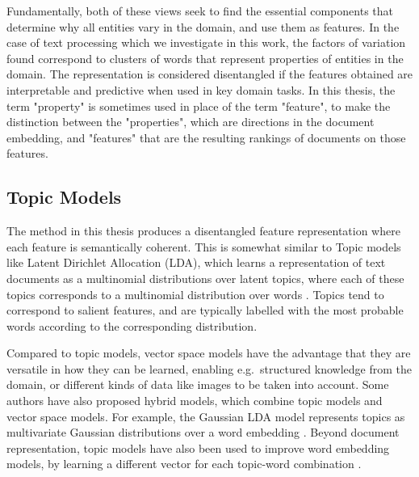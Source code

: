 Fundamentally, both of these views seek to find the essential components that determine why all entities vary in the domain, and use them as features. In the case of text processing which we investigate in this work, the factors of variation found correspond to clusters of words that represent properties of entities in the domain. The representation is considered disentangled if the features obtained are interpretable and  predictive when used in key domain tasks. In this thesis, the term "property" is sometimes used in place of the term "feature", to make the distinction between the "properties", which are directions in the document embedding, and "features"  that are the resulting rankings of documents on those features. 


\subsection{Topic Models}\label{bg:TopicModels}

The method in this thesis produces a disentangled feature representation where each feature is semantically coherent. This is somewhat similar to Topic models like Latent Dirichlet Allocation (LDA), which learns a representation of text documents as  a multinomial distributions over latent topics, where each of these topics corresponds to a multinomial distribution over words \cite{Blei03latentdirichlet}.  Topics tend to correspond to salient features, and are typically labelled with the most probable words according to the corresponding distribution. 

Compared to topic models, vector space models have the advantage that they are versatile in how they can be learned, enabling e.g.\ structured knowledge from the domain, or different kinds of data like images to be taken into account. Some authors have also proposed hybrid models, which combine topic models and vector space models. For example, the Gaussian LDA model represents topics as multivariate Gaussian distributions over a word embedding \cite{DBLP:conf/acl/DasZD15}. Beyond document representation, topic models have also been used to improve word embedding models, by learning a different vector for each topic-word combination \cite{DBLP:conf/aaai/LiuLCS15}.

